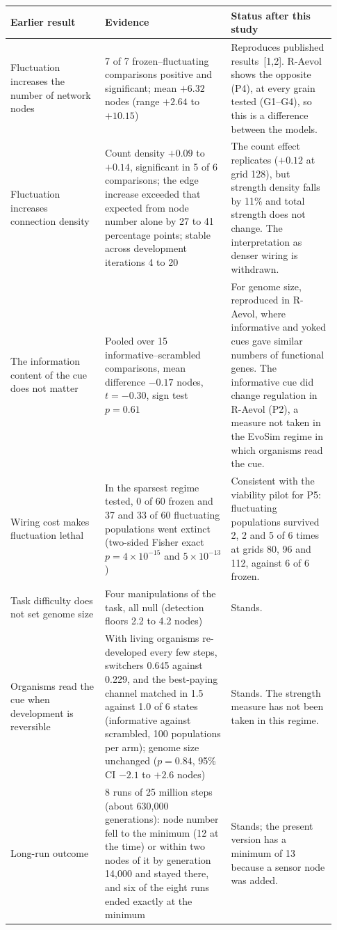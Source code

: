\begin{longtable}{@{}p{0.27\linewidth}p{0.36\linewidth}p{0.3\linewidth}@{}}
\toprule
Earlier result & Evidence & Status after this study\\
\midrule
\endhead
Fluctuation increases the number of network nodes &
7 of 7 frozen--fluctuating comparisons positive and significant; mean $+6.32$
nodes (range $+2.64$ to $+10.15$) &
Reproduces published results~[1,2]. R-Aevol shows the opposite (P4), at every
grain tested (G1--G4), so this is a difference between the models.\\
Fluctuation increases connection density &
Count density $+0.09$ to $+0.14$, significant in 5 of 6 comparisons; the edge
increase exceeded that expected from node number alone by 27 to 41 percentage
points; stable across development iterations 4 to 20 &
The count effect replicates ($+0.12$ at grid 128), but strength density falls
by 11\% and total strength does not change. The interpretation as denser wiring
is withdrawn.\\
The information content of the cue does not matter &
Pooled over 15 informative--scrambled comparisons, mean difference $-0.17$ nodes,
$t=-0.30$, sign test $p=0.61$ &
For genome size, reproduced in R-Aevol, where informative and yoked cues gave
similar numbers of functional genes. The informative cue did change regulation in
R-Aevol (P2), a measure not taken in the EvoSim regime in which organisms read
the cue.\\
Wiring cost makes fluctuation lethal &
In the sparsest regime tested, 0 of 60 frozen and 37 and 33 of 60 fluctuating
populations went extinct (two-sided Fisher exact $p=4\times10^{-15}$ and $5\times10^{-13}$) &
Consistent with the viability pilot for P5: fluctuating populations survived 2,
2 and 5 of 6 times at grids 80, 96 and 112, against 6 of 6 frozen.\\
Task difficulty does not set genome size &
Four manipulations of the task, all null (detection floors 2.2 to 4.2 nodes) &
Stands.\\
Organisms read the cue when development is reversible &
With living organisms re-developed every few steps, switchers 0.645 against 0.229,
and the best-paying channel matched in 1.5 against 1.0 of 6 states
(informative against scrambled, 100 populations per arm); genome size unchanged
($p=0.84$, 95\% CI $-2.1$ to $+2.6$ nodes) &
Stands. The strength measure has not been taken in this regime.\\
Long-run outcome &
8 runs of 25 million steps (about 630{,}000 generations): node number fell to the
minimum (12 at the time) or within two nodes of it by generation 14{,}000 and
stayed there, and six of the eight runs ended exactly at the minimum &
Stands; the present version has a minimum of 13 because a sensor node was
added.\\
\bottomrule
\end{longtable}

